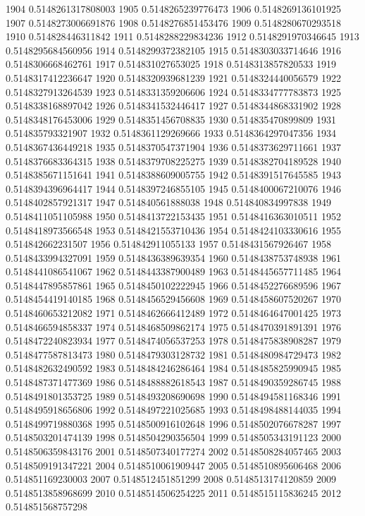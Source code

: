 1904 0.5148261317808003
1905 0.5148265239776473
1906 0.5148269136101925
1907 0.5148273006691876
1908 0.5148276851453476
1909 0.5148280670293518
1910 0.514828446311842
1911 0.5148288229834236
1912 0.5148291970346645
1913 0.5148295684560956
1914 0.5148299372382105
1915 0.5148303033714646
1916 0.5148306668462761
1917 0.514831027653025
1918 0.5148313857820533
1919 0.5148317412236647
1920 0.5148320939681239
1921 0.5148324440056579
1922 0.5148327913264539
1923 0.5148331359206606
1924 0.5148334777783873
1925 0.5148338168897042
1926 0.5148341532446417
1927 0.5148344868331902
1928 0.5148348176453006
1929 0.5148351456708835
1930 0.514835470899809
1931 0.514835793321907
1932 0.5148361129269666
1933 0.5148364297047356
1934 0.5148367436449218
1935 0.5148370547371904
1936 0.5148373629711661
1937 0.5148376683364315
1938 0.5148379708225275
1939 0.5148382704189528
1940 0.5148385671151641
1941 0.5148388609005755
1942 0.5148391517645585
1943 0.5148394396964417
1944 0.5148397246855105
1945 0.5148400067210076
1946 0.5148402857921317
1947 0.514840561888038
1948 0.514840834997838
1949 0.5148411051105988
1950 0.5148413722153435
1951 0.5148416363010511
1952 0.5148418973566548
1953 0.5148421553710436
1954 0.5148424103330616
1955 0.514842662231507
1956 0.514842911055133
1957 0.5148431567926467
1958 0.5148433994327091
1959 0.5148436389639354
1960 0.5148438753748938
1961 0.5148441086541067
1962 0.5148443387900489
1963 0.5148445657711485
1964 0.5148447895857861
1965 0.5148450102222945
1966 0.5148452276689596
1967 0.5148454419140185
1968 0.5148456529456608
1969 0.5148458607520267
1970 0.5148460653212082
1971 0.5148462666412489
1972 0.5148464647001425
1973 0.5148466594858337
1974 0.5148468509862174
1975 0.5148470391891391
1976 0.5148472240823934
1977 0.5148474056537253
1978 0.5148475838908287
1979 0.5148477587813473
1980 0.5148479303128732
1981 0.5148480984729473
1982 0.5148482632490592
1983 0.5148484246286464
1984 0.5148485825990945
1985 0.5148487371477369
1986 0.5148488882618543
1987 0.5148490359286745
1988 0.5148491801353725
1989 0.5148493208690698
1990 0.5148494581168346
1991 0.5148495918656806
1992 0.5148497221025685
1993 0.5148498488144035
1994 0.5148499719880368
1995 0.5148500916102648
1996 0.5148502076678287
1997 0.5148503201474139
1998 0.5148504290356504
1999 0.5148505343191123
2000 0.5148506359843176
2001 0.5148507340177274
2002 0.5148508284057465
2003 0.5148509191347221
2004 0.5148510061909447
2005 0.5148510895606468
2006 0.514851169230003
2007 0.5148512451851299
2008 0.5148513174120859
2009 0.5148513858968699
2010 0.5148514506254225
2011 0.5148515115836245
2012 0.514851568757298
